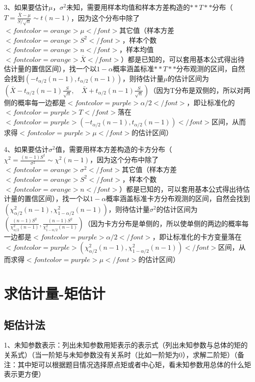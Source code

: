 3、如果要估计$ \mu $，$ \sigma^{2} $未知，需要用样本均值和样本方差构造的$ **T** $分布（$ T=\frac{\bar{X}-\mu}{S / \sqrt{n}} \sim t(n-1) $，因为这个分布中除了$ <font color=orange>\mu</font> $其它值（样本方差$ <font color=orange>S^2</font> $，样本个数$ <font color=orange>n</font> $，样本均值$ <font color=orange>\bar{X}</font> $）都是已知的，可以套用基本公式得出待估计量的置信区间），找一个以$ 1−α $概率涵盖标准$ **T** $分布观测的区间，自然会找到$ (−t_{\alpha/2}(n-1),t_{\alpha/2}(n-1)) $，则待估计量$ \mu $的估计区间为$ \left(\bar{X}-t_{{\alpha}/{2}}(n-1) \frac{S}{\sqrt{n}}, \quad \bar{X}+t_{{\alpha}/{2}}(n-1) \frac{S}{\sqrt{n}}\right) $（因为T分布是双侧的，所以对两侧的概率每一边都是$ <font color=purple>\alpha/2</font> $，即让标准化的$ <font color=purple>T</font> $落在$ <font color=purple>(−t_{\alpha/2}(n-1),t_{\alpha/2}(n-1))</font> $区间，从而求得$ <font color=purple>\mu</font> $的估计区间）

4、如果要估计$ \sigma^{2} $值，需要用样本方差构造的卡方分布（$ \chi^{2}=\frac{(n-1) S^{2}}{\sigma^{2}} \sim \chi^{2}(n-1) $，因为这个分布中除了$ <font color=orange>\sigma^{2}</font> $其它值（样本方差$ <font color=orange>S^2</font> $，样本个数$ <font color=orange>n</font> $）都是已知的，可以套用基本公式得出待估计量的置信区间），找一个以$ 1−α $概率涵盖标准卡方分布观测的区间，自然会找到$ (\chi_{{\alpha}/{2}}^{2}(n-1),\chi_{1-{\alpha}/{2}}^{2}(n-1)) $，则待估计量$ \sigma^{2} $的估计区间为$ \left(\frac{(n-1) S^{2}}{\chi_{{\alpha}/{2}}^{2}(n-1)}, \frac{(n-1) S^{2}}{\chi_{1-{\alpha}/{2}}^{2}(n-1)}\right) $（因为卡方分布是单侧的，所以使单侧的两边的概率每一边都是$ <font color=purple>\alpha/2</font> $，即让标准化的卡方变量落在$ <font color=purple>(\chi_{{\alpha}/{2}}^{2}(n-1),\chi_{1-{\alpha}/{2}}^{2}(n-1))</font> $区间，从而求得$ <font color=purple>\mu</font> $的估计区间）

\section{求估计量-矩估计}



\subsection{矩估计法}

1、未知参数表示：列出未知参数用矩表示的表示式（列出未知参数与总体的矩的关系式）（当一阶矩与未知参数没有关系时（比如一阶矩为0），求解二阶矩）（备注：其中矩可以根据题目情况选择原点矩或者中心矩，看未知参数用总体的什么矩表示更方便）

